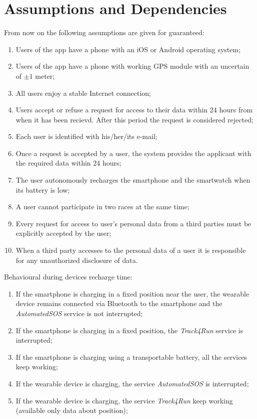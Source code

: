 \section{Assumptions and Dependencies}
From now on the following assumptions are given for guaranteed:
\begin{enumerate}
  \item Users of the app have a phone with an iOS or Android operating system;
  \item Users of the app have a phone with working GPS module with an uncertain of \begin{math} \pm1 \end{math} meter;
  \item All users enjoy a stable Internet connection;
  \item Users accept or refuse a request for access to their data within 24 hours from when it has been recievd. After this period the request is considered rejected;
  \item Each user is identified with his/her/its e-mail;
  \item Once a request is accepted by a user, the system provides the applicant with the required data within 24 hours;
  \item The user autonomously recharges the smartphone and the smartwatch when its battery is low;
  \item A user cannot participate in two races at the same time;
  \item Every request for access to user's personal data from a third parties must be explicitly accepted by the user;
  \item When a third party accesses to the personal data of a user it is responsible for any unauthorized disclosure of data.
\end{enumerate}

\vspace{1cm}

Behavioural during devices recharge time:
\begin{enumerate}
  \item If the smartphone is charging in a fixed position near the user, the wearable device remains connected via Bluetooth to the smartphone and the \textit{AutomatedSOS} service is not interrupted;
  \item If the smartphone is charging in a fixed position, the \textit{Track4Run} service is interrupted;
  \item If the smartphone is charging using a transportable battery, all the services keep working;
  \item If the wearable device is charging, the service \textit{AutomatedSOS} is interrupted;
  \item If the wearable device is charging, the service \textit{Track4Run} keep working (available only data about position);
\end{enumerate}

